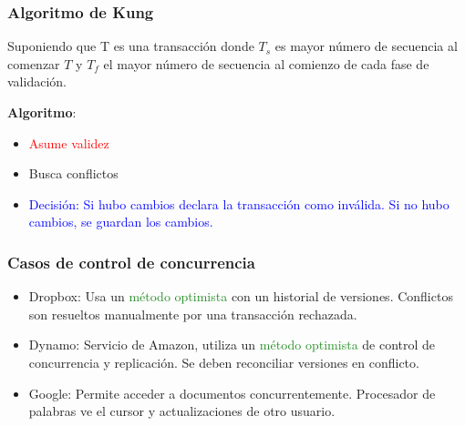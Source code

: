 \subsubsection{Algoritmo de Kung}
Suponiendo que T es una transacción donde $T_s$ es mayor número de secuencia al comenzar $T$ y $T_f$ el mayor número de secuencia al comienzo de cada fase de validación.

\textbf{Algoritmo}:

\begin{itemize}
    \item \textcolor{red}{Asume validez}
    \item \textcolor{Sepia}{Busca conflictos}
    \item \textcolor{blue}{Decisión: Si hubo cambios declara la transacción como inválida. Si no hubo cambios, se guardan los cambios.}
\end{itemize}

\subsubsection{Casos de control de concurrencia}

     \begin{itemize}
         \item Dropbox: Usa un \textcolor{ForestGreen}{método optimista} con un historial de versiones. Conflictos son resueltos manualmente por una transacción rechazada.
         \item Dynamo: Servicio de Amazon, utiliza un \textcolor{ForestGreen}{método optimista} de control de concurrencia y replicación. Se deben reconciliar versiones en conflicto.
         \item Google: \textcolor{Sepia}{Permite acceder a documentos concurrentemente}. Procesador de palabras ve el cursor y actualizaciones de otro usuario.
     \end{itemize}
